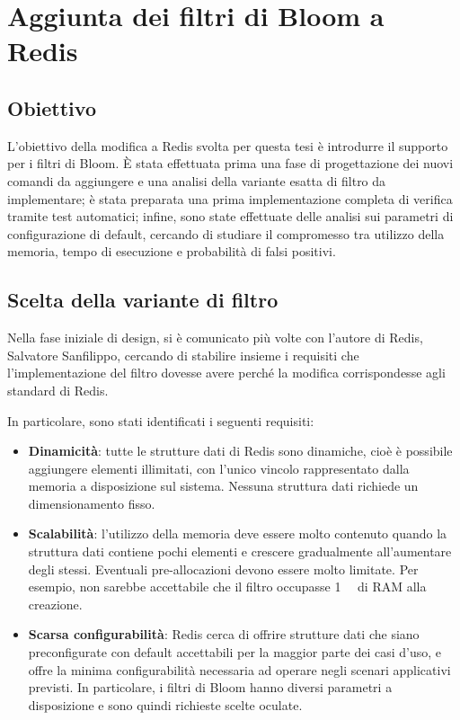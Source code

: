 \chapter{Aggiunta dei filtri di Bloom a Redis}

\section{Obiettivo}

L'obiettivo della modifica a Redis svolta per questa tesi è introdurre il supporto per i filtri di
Bloom. È stata effettuata prima una fase di progettazione dei nuovi comandi da aggiungere e una
analisi della variante esatta di filtro da implementare; è stata preparata una prima implementazione
completa di verifica tramite test automatici; infine, sono state effettuate delle analisi sui
parametri di configurazione di default, cercando di studiare il compromesso tra utilizzo della
memoria, tempo di esecuzione e probabilità di falsi positivi.

\section{Scelta della variante di filtro}

Nella fase iniziale di design, si è comunicato più volte con l'autore di Redis, Salvatore
Sanfilippo, cercando di stabilire insieme i requisiti che l'implementazione del filtro dovesse
avere perché la modifica corrispondesse agli standard di Redis.

In particolare, sono stati identificati i seguenti requisiti:

\begin{itemize}
	\medskip
	\item \textbf{Dinamicità}: tutte le strutture dati di Redis sono dinamiche, cioè è possibile
	aggiungere elementi illimitati, con l'unico vincolo rappresentato dalla memoria a disposizione
	sul sistema. Nessuna struttura dati richiede un dimensionamento fisso.

	\item \textbf{Scalabilità}: l'utilizzo della memoria deve essere molto contenuto quando la
	struttura dati contiene pochi elementi e crescere gradualmente all'aumentare degli stessi.
	Eventuali pre-allocazioni devono essere molto limitate. Per esempio, non sarebbe accettabile che
	il filtro occupasse \SI{1}{\mebi\byte} di RAM alla creazione.

	\item \textbf{Scarsa configurabilità}: Redis cerca di offrire strutture dati che siano
	preconfigurate con default accettabili per la maggior parte dei casi d'uso, e offre la minima
	configurabilità necessaria ad operare negli scenari applicativi previsti. In particolare,
	i filtri di Bloom hanno diversi parametri a disposizione e sono quindi richieste scelte
	oculate.
\end{itemize}

